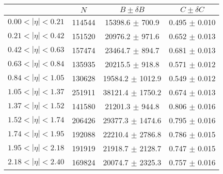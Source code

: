 \begin{tabular}{lccc}
\hline
    &   $N$   & $B \pm \delta B$  &  $C \pm \delta C$ \\
\hline
$0.00 < |\eta| <0.21$          & 114544     & 15398.6    $\pm$ 700.9 & 0.495      $\pm$ 0.010 \\
$0.21 < |\eta| <0.42$          & 151520     & 20976.2    $\pm$ 971.6 & 0.652      $\pm$ 0.013 \\
$0.42 < |\eta| <0.63$          & 157474     & 23464.7    $\pm$ 894.7 & 0.681      $\pm$ 0.013 \\
$0.63 < |\eta| <0.84$          & 135935     & 20215.5    $\pm$ 918.8 & 0.571      $\pm$ 0.012 \\
$0.84 < |\eta| <1.05$          & 130628     & 19584.2    $\pm$ 1012.9 & 0.549      $\pm$ 0.012 \\
$1.05 < |\eta| <1.37$          & 251911     & 38121.4    $\pm$ 1750.2 & 0.674      $\pm$ 0.013 \\
$1.37 < |\eta| <1.52$          & 141580     & 21201.3    $\pm$ 944.8 & 0.806      $\pm$ 0.016 \\
$1.52 < |\eta| <1.74$          & 206426     & 29377.3    $\pm$ 1474.6 & 0.795      $\pm$ 0.016 \\
$1.74 < |\eta| <1.95$          & 192088     & 22210.4    $\pm$ 2786.8 & 0.786      $\pm$ 0.015 \\
$1.95 < |\eta| <2.18$          & 191919     & 21918.7    $\pm$ 2128.7 & 0.747      $\pm$ 0.015 \\
$2.18 < |\eta| <2.40$          & 169824     & 20074.7    $\pm$ 2325.3 & 0.757      $\pm$ 0.016 \\
\hline
\end{tabular}
